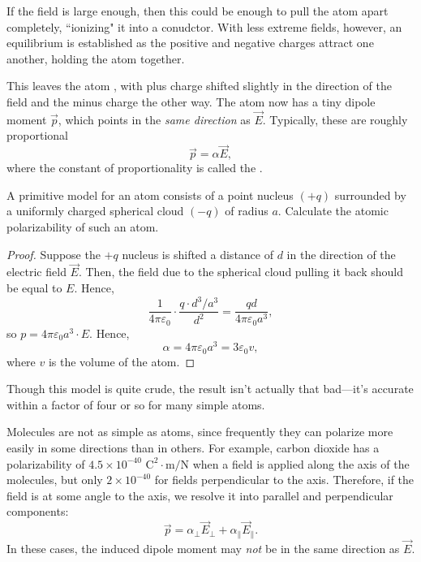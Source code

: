 If the field is large enough, then this could be enough to pull the atom apart completely, ``ionizing" it into a conudctor. With less extreme fields, however, an equilibrium is established as the positive and negative charges attract one another, holding the atom together. 

This leaves the atom , with plus charge shifted slightly in the direction of the field and the minus charge the other way. The atom now has a tiny dipole moment $\vec{p}$, which points in the \textit{same direction} as $\vec{E}$. Typically, these are roughly proportional
\[\vec{p}=\alpha\vec{E},\]
where the constant of proportionality is called the .

\begin{example}\label{primatompolar}
A primitive model for an atom consists of a point nucleus $(+q)$ surrounded by a uniformly charged spherical cloud $(-q)$ of radius $a$. Calculate the atomic polarizability of such an atom.
\end{example}

\begin{proof}
Suppose the $+q$ nucleus is shifted a distance of $d$ in the direction of the electric field $\vec{E}$. Then, the field due to the spherical cloud pulling it back should be equal to $E$. Hence,
\[\frac{1}{4\pi\varepsilon_0}\cdot \frac{q\cdot d^3/a^3}{d^2}=\frac{qd}{4\pi\varepsilon_0 a^3},\]
so $p=4\pi\varepsilon_0 a^3\cdot E$. Hence,
\[\alpha=4\pi\varepsilon_0a^3=3\varepsilon_0 v,\]
where $v$ is the volume of the atom.
\end{proof}

\begin{remark}
Though this model is quite crude, the result isn't actually that bad---it's accurate within a factor of four or so for many simple atoms.
\end{remark}

Molecules are not as simple as atoms, since frequently they can polarize more easily in some directions than in others. For example, carbon dioxide has a polarizability of $4.5\times 10^{-40} \text{ C}^2\cdot\text{m}/\text{N}$ when a field is applied along the axis of the molecules, but only $2\times 10^{-40}$ for fields perpendicular to the axis. Therefore, if the field is at some angle to the axis, we resolve it into parallel and perpendicular components:
\[\vec{p}=\alpha_\perp\vec{E}_\perp + \alpha_\parallel \vec{E}_\parallel.\]
In these cases, the induced dipole moment may \textit{not} be in the same direction as $\vec{E}$.


